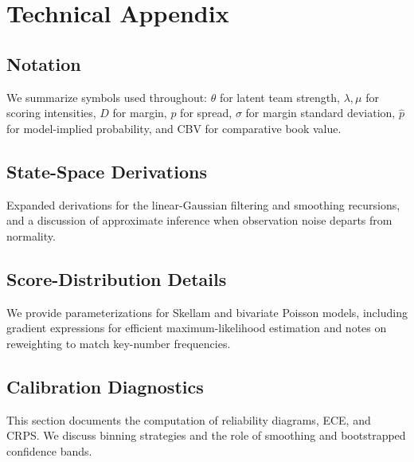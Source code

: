 \documentclass[12pt]{report}  %
\numberwithin{equation}{section}
\theoremstyle{plain}
\theoremstyle{definition}
\theoremstyle{remark}
\begin{document}











\appendix
\makeatletter
\renewcommand\thechapter{\AlphAlph{\value{chapter}}}
\makeatother
\chapter{Technical Appendix}
\section{Notation}
We summarize symbols used throughout: $\theta$ for latent team strength, $\lambda,\mu$ for scoring intensities, $D$ for margin, $p$ for spread, $\sigma$ for margin standard deviation, $\hat p$ for model-implied probability, and CBV for comparative book value.

\section{State-Space Derivations}
Expanded derivations for the linear-Gaussian filtering and smoothing recursions, and a discussion of approximate inference when observation noise departs from normality.

\section{Score-Distribution Details}
We provide parameterizations for Skellam and bivariate Poisson models, including gradient expressions for efficient maximum-likelihood estimation and notes on reweighting to match key-number frequencies.

\section{Calibration Diagnostics}
This section documents the computation of reliability diagrams, ECE, and CRPS. We discuss binning strategies and the role of smoothing and bootstrapped confidence bands.
\end{document}
